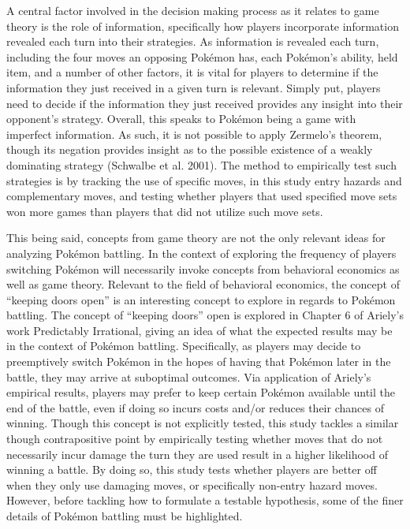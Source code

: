\documentclass[12pt,twoside]{reedthesis}
\begin{document}
  A central factor involved in the decision making process as it relates
  to game theory is the role of information, specifically how players
  incorporate information revealed each turn into their strategies. As
  information is revealed each turn, including the four moves an opposing
  Pokémon has, each Pokémon's ability, held item, and a number of other
  factors, it is vital for players to determine if the information they
  just received in a given turn is relevant. Simply put, players need to
  decide if the information they just received provides any insight into
  their opponent's strategy. Overall, this speaks to Pokémon being a game
  with imperfect information. As such, it is not possible to apply
  Zermelo's theorem, though its negation provides insight as to the
  possible existence of a weakly dominating strategy (Schwalbe et al.
  2001). The method to empirically test such strategies is by tracking the
  use of specific moves, in this study entry hazards and complementary
  moves, and testing whether players that used specified move sets won
  more games than players that did not utilize such move sets.
  
  This being said, concepts from game theory are not the only relevant
  ideas for analyzing Pokémon battling. In the context of exploring the
  frequency of players switching Pokémon will necessarily invoke concepts
  from behavioral economics as well as game theory. Relevant to the field
  of behavioral economics, the concept of ``keeping doors open'' is an
  interesting concept to explore in regards to Pokémon battling. The
  concept of ``keeping doors'' open is explored in Chapter 6 of Ariely's
  work Predictably Irrational, giving an idea of what the expected results
  may be in the context of Pokémon battling. Specifically, as players may
  decide to preemptively switch Pokémon in the hopes of having that
  Pokémon later in the battle, they may arrive at suboptimal outcomes. Via
  application of Ariely's empirical results, players may prefer to keep
  certain Pokémon available until the end of the battle, even if doing so
  incurs costs and/or reduces their chances of winning. Though this
  concept is not explicitly tested, this study tackles a similar though
  contrapositive point by empirically testing whether moves that do not
  necessarily incur damage the turn they are used result in a higher
  likelihood of winning a battle. By doing so, this study tests whether
  players are better off when they only use damaging moves, or
  specifically non-entry hazard moves. However, before tackling how to
  formulate a testable hypothesis, some of the finer details of Pokémon
  battling must be highlighted.
  
\end{document}

